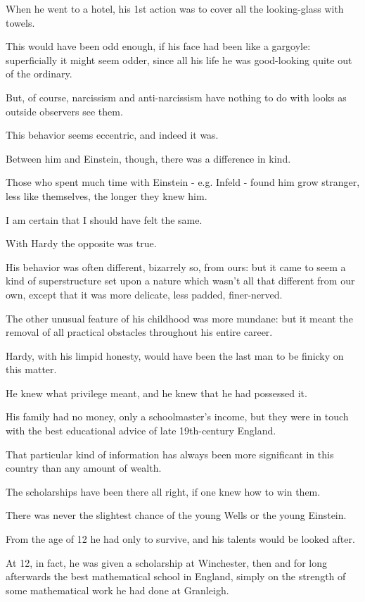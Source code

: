 \documentclass{article}
\numberwithin{equation}{section}
\begin{document}
When he went to a hotel, his 1st action was to cover all the looking-glass with towels.

This would have been odd enough, if his face had been like a gargoyle: superficially it might seem odder, since all his life he was good-looking quite out of the ordinary.

But, of course, narcissism and anti-narcissism have nothing to do with looks as outside observers see them.

%
This behavior seems eccentric, and indeed it was.

Between him and Einstein, though, there was a difference in kind.

Those who spent much time with Einstein - e.g. Infeld - found him grow stranger, less like themselves, the longer they knew him.

I am certain that I should have felt the same.

With Hardy the opposite was true.

His behavior was often different, bizarrely so, from ours: but it came to seem a kind of superstructure set upon a nature which wasn't all that different from our own, except that it was more delicate, less padded, finer-nerved.

%
The other unusual feature of his childhood was more mundane: but it meant the removal of all practical obstacles throughout his entire career.

Hardy, with his limpid honesty, would have been the last man to be finicky on this matter.

He knew what privilege meant, and he knew that he had possessed it.

His family had no money, only a schoolmaster's income, but they were in touch with the best educational advice of late 19th-century England.

That particular kind of information has always been more significant in this country than any amount of wealth.

The scholarships have been there all right, if one knew how to win them.

There was never the slightest chance of the young Wells or the young Einstein.

From the age of 12 he had only to survive, and his talents would be looked after.

%
At 12, in fact, he was given a scholarship at Winchester, then and for long afterwards the best mathematical school in England, simply on the strength of some mathematical work he had done at Granleigh.
\end{document}
